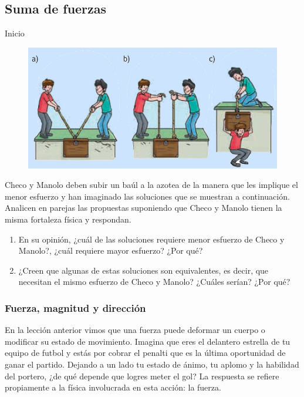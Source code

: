 \documentclass[11pt]{book}
\begin{document}
\subsection{Suma de fuerzas}
\begin{boxF}
  \begin{center}\color{colorrds}\large Inicio\end{center}
  \begin{figure}[H]
    \centering
    \includegraphics[width=0.8\linewidth]{subir.jpg}
  \end{figure}%
  Checo y Manolo deben subir un baúl a la azotea de la manera que les implique el menor esfuerzo
  y han imaginado las soluciones que se muestran a continuación.
  Analicen en parejas las propuestas suponiendo que Checo y Manolo tienen la misma fortaleza
  física y respondan.
  \begin{enumerate}
    \item En su opinión, ¿cuál de las soluciones requiere menor esfuerzo de Checo y Manolo?,
          ¿cuál requiere mayor esfuerzo? ¿Por qué?
    \item ¿Creen que algunas de estas soluciones son equivalentes, es decir, que necesitan el
          mismo esfuerzo de Checo y Manolo? ¿Cuáles serían? ¿Por qué?
  \end{enumerate}
\end{boxF}

\subsubsection{Fuerza, magnitud y dirección}
En la lección anterior vimos que una fuerza puede deformar un cuerpo o modificar su estado de
movimiento. Imagina que eres el delantero estrella de tu equipo de futbol y estás por cobrar
el penalti que es la última oportunidad de ganar el partido. Dejando a un lado tu estado de
ánimo, tu aplomo y la habilidad del portero, ¿de qué depende que logres meter el gol?
La respuesta se refiere propiamente a la física involucrada en esta acción: la fuerza.
\end{document}
